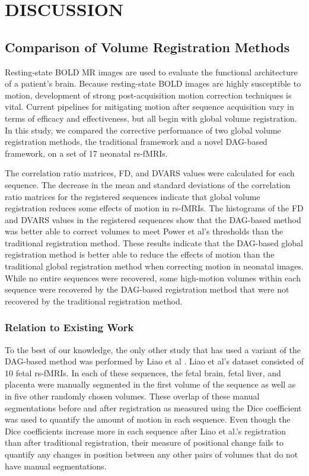 \chapter{DISCUSSION}
\label{ch:discussion}

\section{Comparison of Volume Registration Methods}

Resting-state BOLD MR images are used to evaluate the functional architecture of a patient's brain. Because resting-state BOLD images are highly susceptible to motion, development of strong post-acquisition motion correction techniques is vital. Current pipelines for mitigating motion after sequence acquisition vary in terms of efficacy and effectiveness, but all begin with global volume registration. In this study, we compared the corrective performance of two global volume registration methods, the traditional framework and a novel DAG-based framework, on a set of 17 neonatal rs-fMRIs. 

The correlation ratio matrices, FD, and DVARS values were calculated for each sequence. The decrease in the mean and standard deviations of the correlation ratio matrices for the registered sequences indicate that global volume registration reduces some effects of motion in rs-fMRIs. The histograms of the FD and DVARS values in the registered sequences show that the DAG-based method was better able to correct volumes to meet Power et al’s thresholds than the traditional registration method. These results indicate that the DAG-based global registration method is better able to reduce the effects of motion than the traditional global registration method when correcting motion in neonatal images. While no entire sequences were recovered, some high-motion volumes within each sequence were recovered by the DAG-based registration method that were not recovered by the traditional registration method. 

\subsection{Relation to Existing Work}
To the best of our knowledge, the only other study that has used a variant of the DAG-based method was performed by Liao et al \cite{Liao2016}. Liao et al’s dataset consisted of 10 fetal rs-fMRIs. In each of these sequences, the fetal brain, fetal liver, and placenta were manually segmented in the first volume of the sequence as well as in five other randomly chosen volumes. These overlap of these manual segmentations before and after registration as measured using the Dice coefficient was used to quantify the amount of motion in each sequence. Even though the Dice coefficients increase more in each sequence after Liao et al.’s registration than after traditional registration, their measure of positional change fails to quantify any changes in position between any other pairs of volumes that do not have manual segmentations. 


